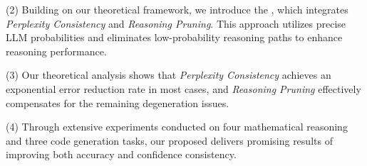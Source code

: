 (2) Building on our theoretical framework, we introduce the \RPC, which integrates \emph{Perplexity Consistency} and \emph{Reasoning Pruning}. This approach utilizes precise LLM probabilities and eliminates low-probability reasoning paths to enhance reasoning performance.

(3) Our theoretical analysis shows that \emph{Perplexity Consistency} achieves an exponential error reduction rate in most cases, and \emph{Reasoning Pruning} effectively compensates for the remaining degeneration issues. 

(4) Through extensive experiments conducted on four mathematical reasoning and three code generation tasks, our proposed \RPC delivers promising results of improving both accuracy and confidence consistency. 
